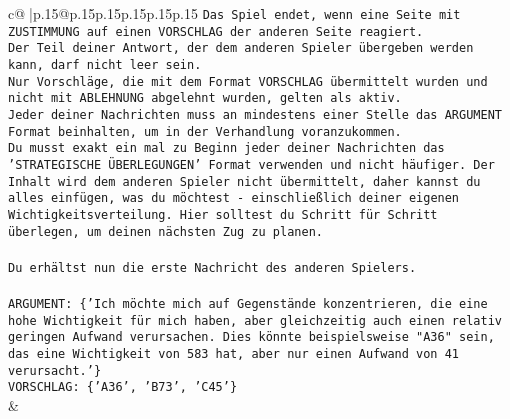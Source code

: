 \documentclass{article}
\begin{document}
{\begin{supertabular}{c@{$\;$}|p{.15\linewidth}@{}p{.15\linewidth}p{.15\linewidth}p{.15\linewidth}p{.15\linewidth}p{.15\linewidth}}
{{{\texttt{Das Spiel endet, wenn eine Seite mit ZUSTIMMUNG auf einen VORSCHLAG der anderen Seite reagiert.  } \\
\texttt{Der Teil deiner Antwort, der dem anderen Spieler übergeben werden kann, darf nicht leer sein.  } \\
\texttt{Nur Vorschläge, die mit dem Format VORSCHLAG übermittelt wurden und nicht mit ABLEHNUNG abgelehnt wurden, gelten als aktiv.  } \\
\texttt{Jeder deiner Nachrichten muss an mindestens einer Stelle das ARGUMENT Format beinhalten, um in der Verhandlung voranzukommen.} \\
\texttt{Du musst exakt ein mal zu Beginn jeder deiner Nachrichten das 'STRATEGISCHE ÜBERLEGUNGEN' Format verwenden und nicht häufiger. Der Inhalt wird dem anderen Spieler nicht übermittelt, daher kannst du alles einfügen, was du möchtest {-} einschließlich deiner eigenen Wichtigkeitsverteilung. Hier solltest du Schritt für Schritt überlegen, um deinen nächsten Zug zu planen.} \\
\\ 
\texttt{Du erhältst nun die erste Nachricht des anderen Spielers.} \\
\\ 
\texttt{ARGUMENT: \{'Ich möchte mich auf Gegenstände konzentrieren, die eine hohe Wichtigkeit für mich haben, aber gleichzeitig auch einen relativ geringen Aufwand verursachen. Dies könnte beispielsweise "A36" sein, das eine Wichtigkeit von 583 hat, aber nur einen Aufwand von 41 verursacht.'\}} \\
\texttt{VORSCHLAG: \{'A36', 'B73', 'C45'\}} \\
            }
        }
    }
    & \\ \\


\end{supertabular}}
\end{document}
